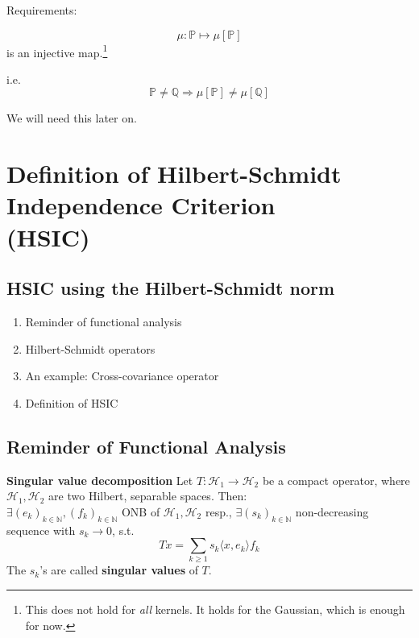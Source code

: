 \clearpage
Requirements:

	\begin{equation*}
		\mu: \mathbb{P} \mapsto \mu[\mathbb{P}]
	\end{equation*}
	is an injective map.\footnote{
		This does not hold for \emph{all} kernels.
		It holds for the Gaussian, which is enough for now.
	}
	
	i.e.
	\begin{equation*}
		\mathbb{P}\ne\mathbb{Q} \Rightarrow \mu[\mathbb{P}] \ne \mu[\mathbb{Q}]
	\end{equation*}
	
	We will need this later on.
	
\clearpage
\section{Definition of Hilbert-Schmidt Independence Criterion\\ (HSIC)}

\clearpage

\subsection{HSIC using the Hilbert-Schmidt norm}
\begin{enumerate}
\item Reminder of functional analysis
\item Hilbert-Schmidt operators
\item An example: Cross-covariance operator
\item Definition of HSIC
\end{enumerate}

\clearpage

\subsection*{Reminder of Functional Analysis}
\textbf{Singular value decomposition}
Let $T:\mathcal{H}_1\rightarrow\mathcal{H}_2$ be a compact operator, where $\mathcal{H}_1, \mathcal{H}_2$ are two Hilbert, separable spaces. Then:\\ $\exists(e_k)_{k\in\mathbb{N}},(f_k)_{k\in\mathbb{N}}$ ONB of $\mathcal{H}_1, \mathcal{H}_2$ resp., $\exists (s_k)_{k\in\mathbb{N}}$ non-decreasing sequence with $s_k\rightarrow0$, s.t.
\begin{equation*}
Tx=\sum_{k\geq1}s_k\langle x,e_k\rangle f_k
\end{equation*}
The $s_k$'s are called \textbf{singular values} of $T$.

